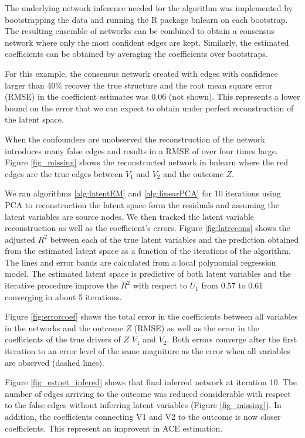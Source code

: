 \documentclass{article}
\begin{document}
The underlying network inference needed for the algorithm was
implemented by bootstrapping the data  and running
the R package bnlearn \cite{bnlearn} on each bootstrap. The resulting
ensemble of networks can be combined to obtain a consensus network
where only the most confident edges are kept. Similarly, the estimated
coefficients can be obtained by averaging the coefficients over
bootstraps.

For this example, the consensus network created with edges with confidence larger than 40\%
recover the true structure and the root mean square error (RMSE) in the
coefficient estimates was 0.06 (not shown). This represents a lower
bound on the error that we can expect to obtain under perfect
reconstruction of the latent space.

When the confounders are unobserved the reconstruction of the network
introduces many false edges and results in a RMSE of over four times
large. Figure \ref{fig_missing} shows the reconstructed network in
bnlearn where the red edges are the true edges between $V_1$ and $V_2$
and the outcome $Z$.

We ran algorithms \ref{alg:latentEM} and \ref{alg:linearPCA} for 10
iterations using PCA to reconstruction the latent space form the
residuals and assuming the latent variables are source nodes. We then tracked the latent variable  reconstruction as well as
the coefficient's errors. Figure \ref{fig:latrecons} shows the adjusted $R^2$
between each of the true latent variables and the prediction obtained
from the estimated latent space as a function of the iterations of the
algorithm. The lines and error bands are calculated from a local
polynomial regression model. The estimated latent space is predictive of both
latent variables and the iterative procedure improve the $R^2$ with
respect to $U_1$ from 0.57 to 0.61 converging in about 5 iterations.

Figure \ref{fig:errorcoef} shows the total error in the coefficients
between all variables in the networks and the outcome $Z$ (RMSE) as
well as the error in the coefficients of the true drivers of $Z$ $V_1$
and $V_2$. Both errors converge after the first iteration to an error
level of the same magniture as the error when all variables are
observed (dashed lines).


Figure \ref{fig_estnet_infered} shows that final inferred network at
iteration 10. The number of edges arriving to the outcome was reduced
considerable with respect to the false edges without inferring latent
variables (Figure \ref{fig_missing}). In addition, the coefficients
connecting V1 and V2 to the outcome is now closer coefficients. This
represent an improvent in ACE estimation.
\end{document}
